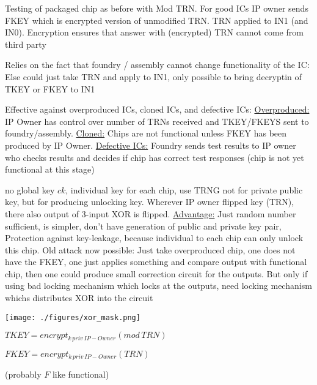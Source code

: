 \documentclass[landscape, a4paper]{article}
\begin{document}
\begin{minipage}[t]{0.2\linewidth}
\begin{betterlist}
\begin{betterlist}
\begin{betterlist}
				\item Testing of packaged chip as before with Mod TRN. For good ICs IP owner sends FKEY which is encrypted version of unmodified TRN. TRN applied to IN1 (and IN0). Encryption ensures that answer with (encrypted) TRN cannot come from third party
				\item \alert{Relies on the fact that foundry / assembly cannot change functionality of the IC:} Else could just take TRN and apply to IN1, only possible to bring decryptin of TKEY or FKEY to IN1
				\item \alert{Effective against overproduced ICs, cloned ICs, and defective ICs:} \underline{Overproduced:} IP Owner has control over number of TRNs received and TKEY/FKEYS sent to foundry/assembly. \underline{Cloned:} Chips are not functional unless FKEY has been produced by IP Owner. \underline{Defective ICs:} Foundry sends test results to IP owner who checks results and decides if chip has correct test responses (chip is not yet functional at this stage)
				\item no global key $ck$, individual key for each chip, use TRNG not for private public key, but for producing unlocking key. Wherever IP owner flipped key (TRN), there also output of 3-input XOR is flipped. \underline{Advantage:} Just random number sufficient, is simpler, don't have generation of public and private key pair, Protection against key-leakage, because individual to each chip can only unlock this chip. Old attack now possible: Just take overproduced chip, one does not have the FKEY, one just applies something and compare output with functional chip, then one could produce small correction circuit for the outputs. But only if using bad locking mechanism which locks at the outputs, need locking mechanism whichs distributes XOR into the circuit %

				\begin{minipage}[b]{0.5\linewidth}
					\texttt{[image: ./figures/xor\_mask.png]}
				\end{minipage}
				\begin{minipage}[b]{0.4\linewidth}
					$TKEY = encrypt_{k\,priv\,IP-Owner}(mod\,TRN)$

					$FKEY = encrypt_{k\,priv\,IP-Owner}(TRN)$

					(probably $F$ like functional)
				\end{minipage}


\end{betterlist}
\end{betterlist}
\end{betterlist}
\end{minipage}
\end{document}
